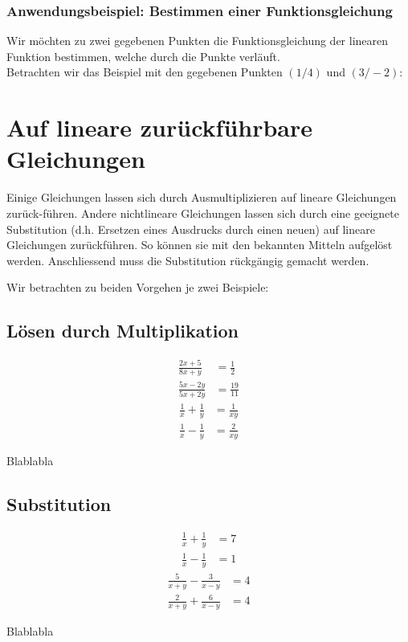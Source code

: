 \documentclass[11pt,oneside]{article}
\begin{document}
	\subsubsection*{Anwendungsbeispiel: Bestimmen einer Funktionsgleichung}
	Wir möchten zu zwei gegebenen Punkten die Funktionsgleichung der linearen Funktion bestimmen, welche durch die Punkte verläuft.\\
	Betrachten wir das Beispiel mit den gegebenen Punkten $(1/4)$ und $(3/-2)$:\vspace{3.5cm}
	\newpage

\section*{Auf lineare zurückführbare Gleichungen}
	Einige Gleichungen lassen sich durch Ausmultiplizieren auf lineare Gleichungen zurück-führen. Andere nichtlineare Gleichungen lassen sich durch eine geeignete Substitution (d.h. Ersetzen eines Ausdrucks durch einen neuen) auf lineare Gleichungen zurückführen. So können sie mit den bekannten Mitteln aufgelöst werden. Anschliessend muss die Substitution rückgängig gemacht werden.

	Wir betrachten zu beiden Vorgehen je zwei Beispiele:
	\subsection*{Lösen durch Multiplikation}
	\begin{beispiel}
		\begin{align*}
			\frac{2x+5}{8x+y}&=\frac{1}{2}\\
			\frac{5x-2y}{5x+2y}&=\frac{19}{11}
		\end{align*}\vspace{3cm}
		\begin{align*}
			\frac{1}{x}+\frac{1}{y}&=\frac{1}{xy}\\
			\frac{1}{x}-\frac{1}{y}&=\frac{2}{xy}
		\end{align*}\vspace{4cm}
	\end{beispiel}
	\begin{aufgabe}
		Blablabla
		\vspace{2cm}
	\end{aufgabe}
	\subsection*{Substitution}
	\begin{align*}
		\frac{1}{x}+\frac{1}{y}&=7\\
		\frac{1}{x}-\frac{1}{y}&=1
	\end{align*}\vspace{3cm}
	\begin{align*}
		\frac{5}{x+y}-\frac{3}{x-y}&=4\\
		\frac{2}{x+y}+\frac{6}{x-y}&=4
	\end{align*}\vspace{5cm}
	\begin{aufgabe}
		Blablabla
		\vspace{2cm}
	\end{aufgabe}
	\newpage
\end{document}
